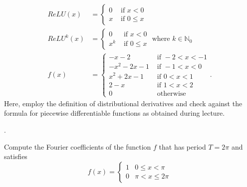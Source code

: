 \documentclass[11pt]{article}
\begin{document}




\begin{exercise}
    \begin{align*}
        ReLU(x) 
        &= \begin{cases} 0 & \text{ if } x < 0 \\ x & \text{ if } 0 \leq x \end{cases}
        \\
        ReLU^{k}(x) 
        &= \begin{cases} 0 & \text{ if } x < 0 \\ x^{k} & \text{ if } 0 \leq x \end{cases} \text{ where } k \in \mathbb N_0
        \\
        f(x) 
        &= 
        \begin{cases} 
            -x-2            & \text{ if } -2 < x < -1
            \\
            - x^{2} - 2x - 1 & \text{ if } -1 < x < 0 
            \\ 
              x^{2} + 2x - 1 & \text{ if } 0 <  x < 1
            \\
            2-x            & \text{ if }  1 < x < 2
            \\
            0              & \text{ otherwise }  
        \end{cases}
        .
    \end{align*}
    Here, employ the definition of distributional derivatives and check against the formula for piecewise differentiable functions as obtained during lecture. 
\end{exercise}
\begin{solution}
    .
\end{solution}
\begin{exercise}
    Compute the Fourier coefficients of the function $f$ that has period $T = 2\pi$ and satisfies
    \[
        f(x) = \left\{\begin{array}{ll} 1 & 0 \leq x < \pi \\ 0 & \pi < x \leq 2\pi \end{array}\right.
    \]
\end{exercise}
\end{document}
